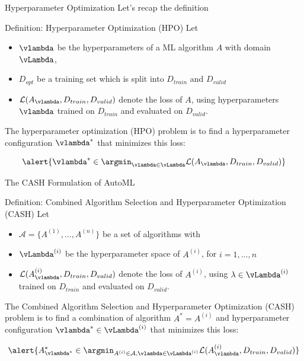 {
\begin{frame}[c]{Hyperparameter Optimization}
Let's recap the definition
\begin{block}{Definition: Hyperparameter Optimization (HPO)}
	Let
	\begin{itemize}
		\item $\vlambda$ be the hyperparameters of a ML algorithm $A$ with domain $\vLambda$,
		\item $D_{opt}$ be a training set which is split into $D_{train}$ and $D_{valid}$
		\item \alert{$\mathcal{L}(A_{\vlambda}, D_{train}, D_{valid})$} denote the loss of $A$, using hyperparameters $\vlambda$ trained on $D_{train}$ and evaluated on $D_{valid}$.
	\end{itemize}
	The \alert{hyperparameter optimization (HPO)} problem is to find a hyperparameter configuration $\vlambda^*$ that minimizes this loss:
	
	\begin{equation}
	\alert{\vlambda^* \in \argmin_{\vlambda \in \vLambda} \mathcal{L}(A_{\vlambda}, D_{train}, D_{valid})} \nonumber 
	\end{equation}
	
\end{block}

\end{frame}
}
{
\begin{frame}[c]{The CASH Formulation of AutoML}

\begin{block}{Definition: Combined Algorithm Selection and Hyperparameter Optimization (CASH)}
Let
\begin{itemize}
	\item $\mathcal{A} = \{ A^{(1)}, \dots, A^{(n)} \}$ be a set of algorithms with
	\item $\vLambda^{(i)}$ be the hyperparameter space of $A^{(i)}$, for $i=1, \dots, n$
	\item \alert{$\mathcal{L}(A^{(i)}_{\vlambda}, D_{train}, D_{valid})$} denote the loss of $A^{(i)}$, using $\lambda \in \vLambda^{(i)}$ trained on $D_{train}$ and evaluated on $D_{valid}$.
\end{itemize}
The \alert{Combined Algorithm Selection and Hyperparameter Optimization (CASH)} problem is to find a combination of algorithm $A^*=A^{(i)}$ and hyperparameter configuration $\vlambda^* \in \vLambda^{(i)}$ that minimizes this loss:

\begin{equation}
\alert{A^*_{\vlambda^*} \in \argmin_{A^{(i)} \in \mathcal{A}, \vlambda \in \vLambda^{(i)}} \mathcal{L}(A^{(i)}_{\vlambda}, D_{train}, D_{valid})} \nonumber 
\end{equation}

\end{block}
\end{frame}
}
